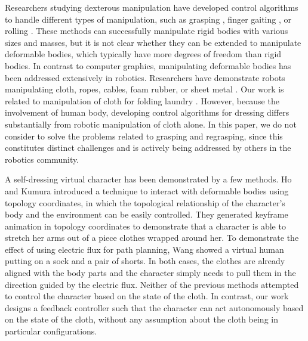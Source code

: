 
Researchers studying dexterous manipulation have developed control algorithms to handle different types of manipulation, such as grasping \cite{Pollard and Zordan 2005; Kry and Pai 2006; Zhao et al. 2013; Wang et al. 2013}, finger gaiting \cite{Ye:2012}, or rolling \cite{Liu, Bai and Liu}. These methods can successfully manipulate rigid bodies with various sizes and masses, but it is not clear whether they can be extended to manipulate deformable bodies, which typically have more degrees of freedom than rigid bodies. In contrast to computer graphics, manipulating deformable bodies has been addressed extensively in robotics. Researchers have demonstrate robots manipulating cloth, ropes, cables, foam rubber, or sheet metal \cite{Kosuge et al. 1995; Wu et al. 1995; Fahantidis et al. 1997; Osawa et al. 2007; Cusumano-Towner et al. 2011; Bersch et al. 2011; Miller et al. 2012}. Our work is related to manipulation of cloth for folding laundry \cite{}. However, because the involvement of human body, developing control algorithms for dressing differs substantially from robotic manipulation of cloth alone. In this paper, we do not consider to solve the problems related to grasping and regrasping, since this constitutes distinct challenges and is actively being addressed by others in the robotics community.



A self-dressing virtual character has been demonstrated by a few methods. Ho and Kumura  introduced a technique to interact with deformable bodies using topology coordinates, in which the topological relationship of the character's body and the environment can be easily controlled. They generated keyframe animation in topology coordinates to demonstrate that a character is able to stretch her arms out of a piece clothes wrapped around her. To demonstrate the effect of using electric flux for path planning, Wang \etal {} showed a virtual human putting on a sock and a pair of shorts. In both cases, the clothes are already aligned with the body parts and the character simply needs to pull them in the direction guided by the electric flux. Neither of the previous methods attempted to control the character based on the state of the cloth. In contrast, our work designs a feedback controller such that the character can act autonomously based on the state of the cloth, without any assumption about the cloth being in particular configurations.

